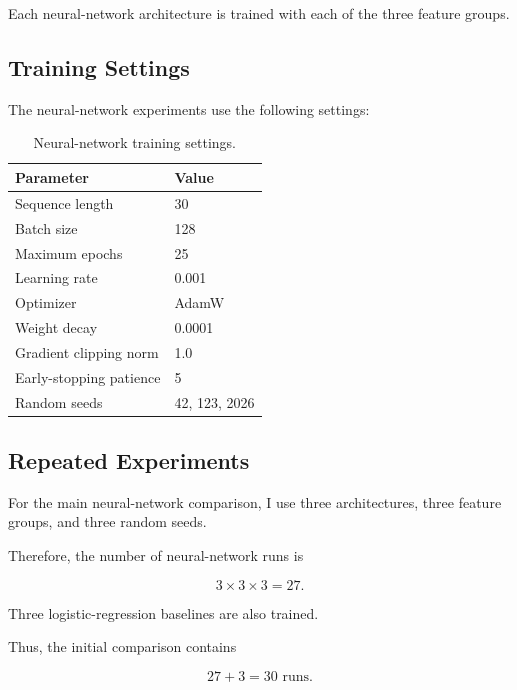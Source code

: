\documentclass[oneside,english,11pt]{article}
\renewcommand{\boxed}[1]{#1}
\begin{document}
Each neural-network architecture is trained
with each of the three feature groups.

\subsection{Training Settings}

The neural-network experiments use the
following settings:

\begin{table}[htbp]
\centering

\caption{Neural-network training settings.}
\label{tab:training}

\begin{tabular}{ll}
\toprule
Parameter & Value\\
\midrule
Sequence length & 30\\
Batch size & 128\\
Maximum epochs & 25\\
Learning rate & 0.001\\
Optimizer & AdamW\\
Weight decay & 0.0001\\
Gradient clipping norm & 1.0\\
Early-stopping patience & 5\\
Random seeds & 42, 123, 2026\\
\bottomrule
\end{tabular}

\end{table}

\subsection{Repeated Experiments}

For the main neural-network comparison,
I use three architectures, three feature
groups, and three random seeds.

Therefore, the number of neural-network
runs is

\begin{equation}
\boxed{
3\times3\times3=27.
}
\end{equation}

Three logistic-regression baselines
are also trained.

Thus, the initial comparison contains

\begin{equation}
\boxed{
27+3=30\text{ runs}.
}
\end{equation}
\end{document}
